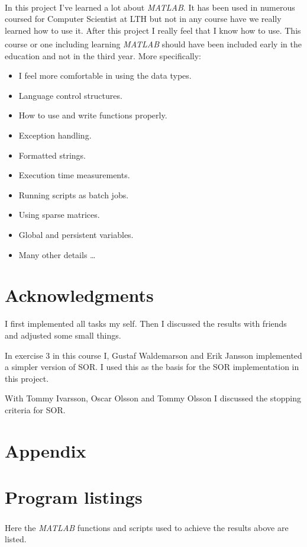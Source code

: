 \documentclass[10pt, a4paper]{article}
\newcommand{\matlab}{\small{\emph{MATLAB\textsuperscript{\textregistered}}}}
\begin{document}
In this project I've learned a lot about \matlab{}. It has been used in numerous coursed for Computer Scientist at LTH but not in any course have we really learned how to use it. After this project I really feel that I know how to use. This course or one including learning \matlab{} should have been included early in the education and not in the third year. More specifically:

\begin{itemize}
	\item I feel more comfortable in using the data types.
	\item Language control structures.
	\item How to use and write functions properly.
	\item Exception handling.
	\item Formatted strings.
	\item Execution time measurements.
	\item Running scripts as batch jobs.
	\item Using sparse matrices.
	\item Global and persistent variables.
	\item Many other details \ldots
\end{itemize}


\section{Acknowledgments}
I first implemented all tasks my self. Then I discussed the results with friends and adjusted some small things.

In exercise 3 in this course I, Gustaf Waldemarson and Erik Jansson implemented a simpler version of SOR. I used this as the basis for the SOR implementation in this project.

With Tommy Ivarsson, Oscar Olsson and Tommy Olsson I discussed the stopping criteria for SOR.

{}


\newpage
\section*{Appendix}
\appendix
\section{Program listings} \label{appendix+programs}
Here the \matlab{} functions and scripts used to achieve the results above are listed.
\end{document}
